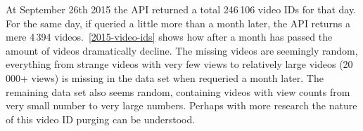 At September 26th 2015 the API returned a total 246\,106 video IDs for that day.
For the same day, if queried a little more than a month later, the API returns
a mere 4\,394 videos.~\ref{2015-video-ids} shows how after a month has passed 
the amount of videos dramatically decline. The missing videos are seemingly 
random, everything from strange videos with very few views to relatively large 
videos (20\,000+ views) is missing in the data set when requeried a month later. 
The remaining data set also seems random, containing videos with view counts 
from very small number to very large numbers. Perhaps with more research the
nature of this video ID purging can be understood.

